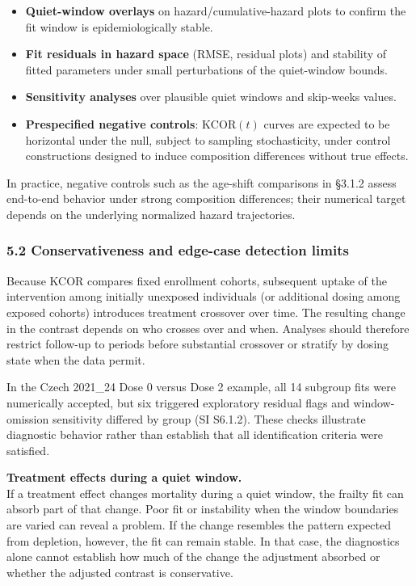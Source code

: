 \documentclass[
]{article}
\providecommand{\tightlist}{%
  \setlength{\itemsep}{0pt}\setlength{\parskip}{0pt}}
\begin{document}
\begin{itemize}
\tightlist
\item
  \textbf{Quiet-window overlays} on hazard/cumulative-hazard plots to confirm the fit window is epidemiologically stable.
\item
  \textbf{Fit residuals in hazard space} (RMSE, residual plots) and stability of fitted parameters under small perturbations of the quiet-window bounds.
\item
  \textbf{Sensitivity analyses} over plausible quiet windows and skip-weeks values.
\item
  \textbf{Prespecified negative controls}: \(\mathrm{KCOR}(t)\) curves are expected to be horizontal under the null, subject to sampling stochasticity, under control constructions designed to induce composition differences without true effects.
\end{itemize}

In practice, negative controls such as the age-shift comparisons in §3.1.2 assess end-to-end behavior under strong composition differences; their numerical target depends on the underlying normalized hazard trajectories.

\subsubsection{5.2 Conservativeness and edge-case detection limits}\label{conservativeness-and-edge-case-detection-limits}

Because KCOR compares fixed enrollment cohorts, subsequent uptake of the intervention among initially unexposed individuals (or additional dosing among exposed cohorts) introduces treatment crossover over time. The resulting change in the contrast depends on who crosses over and when. Analyses should therefore restrict follow-up to periods before substantial crossover or stratify by dosing state when the data permit.

In the Czech 2021\_24 Dose 0 versus Dose 2 example, all 14 subgroup fits were numerically accepted, but six triggered exploratory residual flags and window-omission sensitivity differed by group (SI S6.1.2). These checks illustrate diagnostic behavior rather than establish that all identification criteria were satisfied.

\textbf{Treatment effects during a quiet window.}\\
If a treatment effect changes mortality during a quiet window, the frailty fit can absorb part of that change. Poor fit or instability when the window boundaries are varied can reveal a problem. If the change resembles the pattern expected from depletion, however, the fit can remain stable. In that case, the diagnostics alone cannot establish how much of the change the adjustment absorbed or whether the adjusted contrast is conservative.
\end{document}
